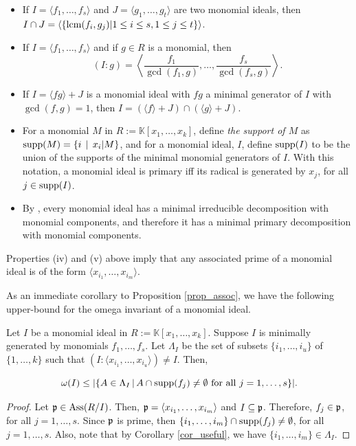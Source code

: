 \documentclass[11pt]{amsart}   %
\begin{document}
\begin{itemize}
    \item[(i)] If $I=\langle f_1,\ldots,f_s\rangle$ and $J=\langle g_1,\ldots,g_t\rangle$ are two monomial ideals, then $I\cap J=\langle \{{\rm lcm}(f_i,g_j)|1\leq i\leq s, 1\leq j\leq t\}\rangle$.
    \item[(ii)] If $I=\langle f_1,\ldots,f_s\rangle$ and if $g\in R$ is a monomial, then
    $$(I:g)=\left\langle\frac{f_1}{\gcd(f_1,g)},\ldots, \frac{f_s}{\gcd(f_s,g)}\right\rangle.$$
    \item[(iii)] If $I=\langle fg\rangle+J$ is a monomial ideal with $fg$ a minimal generator of $I$ with $\gcd(f,g)=1$, then $I=(\langle f\rangle +J)\cap(\langle g\rangle+J)$.
    \item[(iv)] For a monomial $M$ in $R:=\mathbb K[x_1,\ldots,x_k]$, define {\em the support of $M$} as ${\rm supp}(M)=\{i\,\mid \, x_i|M\}$, and for a monomial ideal, $I$, define ${\rm supp}(I)$ to be the union of the supports of the minimal monomial generators of $I$. With this notation, a monomial ideal is primary iff its radical is generated by $x_j$, for all $j\in {\rm supp}(I)$.
    \item[(v)] By \cite[Theorem 5.27]{MiSt}, every monomial ideal has a minimal irreducible decomposition with monomial components, and therefore it has a minimal primary decomposition with monomial components.
\end{itemize}

Properties (iv) and (v) above imply that any associated prime of a monomial ideal is of the form $\langle x_{i_1},\ldots,x_{i_m}\rangle$.

\medskip

As an immediate corollary to Proposition \ref{prop_assoc}, we have the following upper-bound for the omega invariant of a monomial ideal.

\begin{prop}\label{prop_omega_monomial} Let $I$ be a monomial ideal in $R:=\mathbb K[x_1,\ldots,x_k]$. Suppose $I$ is minimally generated by monomials $f_1,\ldots,f_s$. Let $\Lambda_I$ be the set of subsets $\{i_1,\ldots, i_u\}$ of $\{1,\ldots,k\}$ such that $(I:\langle x_{i_1},\ldots,x_{i_u}\rangle)\neq I$. Then,

$$\omega(I)\leq|\{A\in\Lambda_I\,|\, A\cap {\rm supp}(f_j)\neq \emptyset \mbox{ for all } j=1,\ldots,s\}|.$$    
\end{prop}
\begin{proof} Let $\frak p\in{\rm Ass}(R/I)$. Then, $\frak p=\langle x_{i_1},\ldots,x_{i_m}\rangle$ and $I\subseteq \frak p$. Therefore, $f_j\in\frak p$, for all $j=1,\ldots,s$. Since $\frak p$ is prime, then $\{i_1,\ldots,i_m\}\cap{\rm supp}(f_j)\neq\emptyset$, for all $j=1,\ldots,s$.
Also, note that by Corollary \ref{cor_useful},
we have $\{i_1,\ldots,i_m\}\in\Lambda_I$.
\end{proof}
\end{document}
